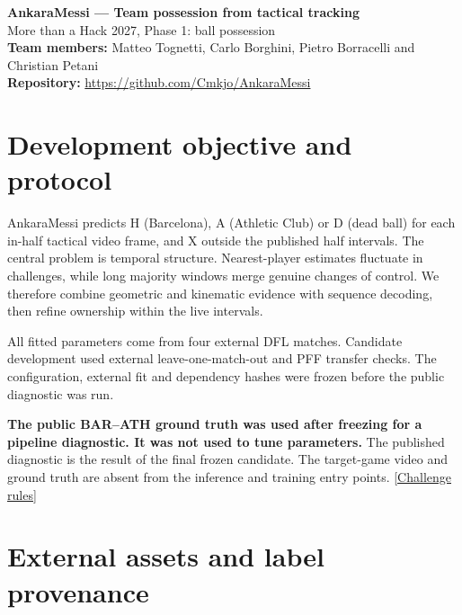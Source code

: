 \documentclass[10pt,a4paper]{article}
\begin{document}
\begin{center}
  {\LARGE\bfseries AnkaraMessi --- Team possession from tactical tracking}\\[0.6em]
  {\normalsize More than a Hack 2027, Phase 1: ball possession}\\[0.4em]
  {\normalsize\textbf{Team members:} Matteo Tognetti, Carlo Borghini, Pietro Borracelli and Christian Petani}\\[0.4em]
  {\normalsize\textbf{Repository:} \url{https://github.com/Cmkjo/AnkaraMessi}}
\end{center}

\section{Development objective and protocol}

AnkaraMessi predicts H (Barcelona), A (Athletic Club) or D (dead ball) for each in-half tactical video
frame, and X outside the published half intervals. The central problem is temporal structure.
Nearest-player estimates fluctuate in challenges, while long majority windows merge genuine changes of
control. We therefore combine geometric and kinematic evidence with sequence decoding, then refine
ownership within the live intervals.

All fitted parameters come from four external DFL matches. Candidate development used external
leave-one-match-out and PFF transfer checks. The configuration, external fit and dependency hashes were
frozen before the public diagnostic was run.

\textbf{The public BAR--ATH ground truth was used after freezing for a pipeline diagnostic. It was not
used to tune parameters.} The published diagnostic is the result of the final frozen candidate. The
target-game video and ground truth are absent from the inference and training entry points.
\href{https://github.com/metrica-sports/more-than-a-hack-2027/blob/main/RULES.md}{[Challenge rules]}

\section{External assets and label provenance}
\end{document}
